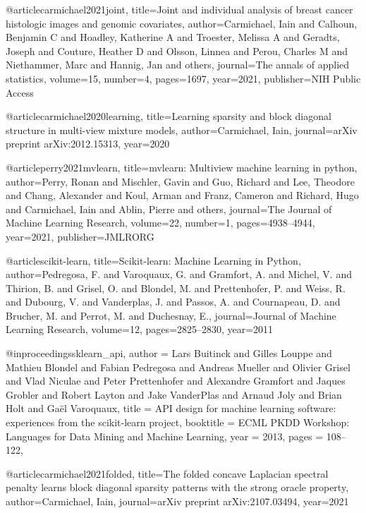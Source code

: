 @article{carmichael2021joint,
  title={Joint and individual analysis of breast cancer histologic images and genomic covariates},
  author={Carmichael, Iain and Calhoun, Benjamin C and Hoadley, Katherine A and Troester, Melissa A and Geradts, Joseph and Couture, Heather D and Olsson, Linnea and Perou, Charles M and Niethammer, Marc and Hannig, Jan and others},
  journal={The annals of applied statistics},
  volume={15},
  number={4},
  pages={1697},
  year={2021},
  publisher={NIH Public Access}
}

@article{carmichael2020learning,
  title={Learning sparsity and block diagonal structure in multi-view mixture models},
  author={Carmichael, Iain},
  journal={arXiv preprint arXiv:2012.15313},
  year={2020}
}


@article{perry2021mvlearn,
  title={mvlearn: Multiview machine learning in python},
  author={Perry, Ronan and Mischler, Gavin and Guo, Richard and Lee, Theodore and Chang, Alexander and Koul, Arman and Franz, Cameron and Richard, Hugo and Carmichael, Iain and Ablin, Pierre and others},
  journal={The Journal of Machine Learning Research},
  volume={22},
  number={1},
  pages={4938--4944},
  year={2021},
  publisher={JMLRORG}
}

@article{scikit-learn,
 title={Scikit-learn: Machine Learning in {P}ython},
 author={Pedregosa, F. and Varoquaux, G. and Gramfort, A. and Michel, V.
         and Thirion, B. and Grisel, O. and Blondel, M. and Prettenhofer, P.
         and Weiss, R. and Dubourg, V. and Vanderplas, J. and Passos, A. and
         Cournapeau, D. and Brucher, M. and Perrot, M. and Duchesnay, E.},
 journal={Journal of Machine Learning Research},
 volume={12},
 pages={2825--2830},
 year={2011}
}

@inproceedings{sklearn_api,
  author    = {Lars Buitinck and Gilles Louppe and Mathieu Blondel and
               Fabian Pedregosa and Andreas Mueller and Olivier Grisel and
               Vlad Niculae and Peter Prettenhofer and Alexandre Gramfort
               and Jaques Grobler and Robert Layton and Jake VanderPlas and
               Arnaud Joly and Brian Holt and Ga{\"{e}}l Varoquaux},
  title     = {{API} design for machine learning software: experiences from the scikit-learn
               project},
  booktitle = {ECML PKDD Workshop: Languages for Data Mining and Machine Learning},
  year      = {2013},
  pages = {108--122},
}

@article{carmichael2021folded,
  title={The folded concave Laplacian spectral penalty learns block diagonal sparsity patterns with the strong oracle property},
  author={Carmichael, Iain},
  journal={arXiv preprint arXiv:2107.03494},
  year={2021}
}

